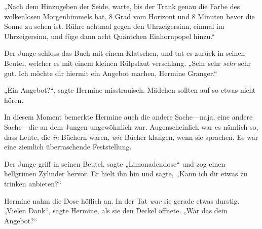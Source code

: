 „Nach dem Hinzugeben der Seide, warte, bis der Trank genau die Farbe des wolkenlosen Morgenhimmels hat, 8 Grad vom Horizont und 8 Minuten bevor die Sonne zu sehen ist. Rühre achtmal gegen den Uhrzeigersinn, einmal im Uhrzeigersinn, und füge dann acht Quäntchen Einhornpopel hinzu.“

Der Junge schloss das Buch mit einem Klatschen, und tat es zurück in seinen Beutel, welcher es mit einem kleinen Rülpslaut verschlang. „Sehr sehr \emph{sehr} sehr gut. Ich möchte dir hiermit ein Angebot machen, Hermine Granger.“

„Ein Angebot?“, sagte Hermine misstrauisch. Mädchen sollten auf so etwas nicht hören.

In diesem Moment bemerkte Hermine auch die andere Sache—naja, eine andere Sache—die an dem Jungen ungewöhnlich war. Augenscheinlich war es nämlich so, dass Leute, die \emph{in} Büchern waren, \emph{wie} Bücher klangen, wenn sie sprachen. Es war eine ziemlich überraschende Feststellung.

Der Junge griff in seinen Beutel, sagte „Limonadendose“ und zog einen hellgrünen Zylinder hervor. Er hielt ihn hin und sagte, „Kann ich dir etwas zu trinken anbieten?“

Hermine nahm die Dose höflich an. In der Tat \emph{war} sie gerade etwas durstig. „Vielen Dank“, sagte Hermine, als sie den Deckel öffnete. „War das dein Angebot?“

